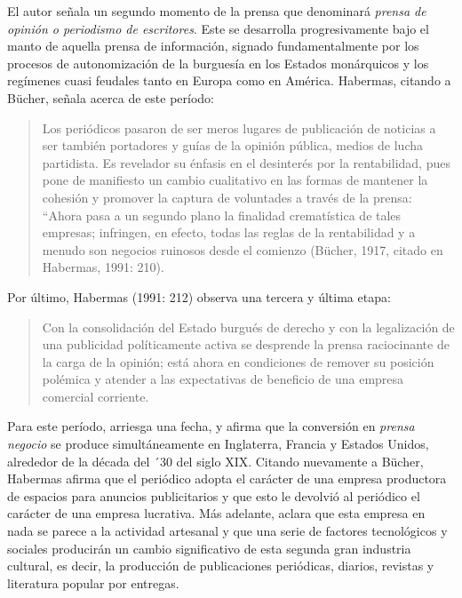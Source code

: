 El autor señala un segundo momento de la prensa que denominará \emph{prensa de opinión o periodismo de escritores}. Este se desarrolla progresivamente bajo el manto de aquella prensa de información, signado fundamentalmente por los procesos de autonomización de la burguesía en los Estados monárquicos y los regímenes cuasi feudales tanto en Europa como en América. Habermas, citando a Bücher, señala acerca de este período:

\begin{quote}
Los periódicos pasaron de ser meros lugares de publicación de noticias a ser también portadores y guías de la opinión pública, medios de lucha partidista. Es revelador su énfasis en el desinterés por la rentabilidad, pues pone de manifiesto un cambio cualitativo en las formas de mantener la cohesión y promover la captura de voluntades a través de la prensa: ``Ahora pasa a un segundo plano la finalidad crematística de tales empresas; infringen, en efecto, todas las reglas de la rentabilidad y a menudo son negocios ruinosos desde el comienzo (Bücher, 1917, citado en Habermas, 1991: 210).
\end{quote}

Por último, Habermas (1991: 212) observa una tercera y última etapa:

\begin{quote}
Con la consolidación del Estado burgués de derecho y con la legalización de una publicidad políticamente activa se desprende la prensa raciocinante de la carga de la opinión; está ahora en condiciones de remover su posición polémica y atender a las expectativas de beneficio de una empresa comercial corriente.
\end{quote}

Para este período, arriesga una fecha, y afirma que la conversión en \emph{prensa negocio} se produce simultáneamente en Inglaterra, Francia y Estados Unidos, alrededor de la década del ´30 del siglo XIX. Citando nuevamente a Bücher, Habermas afirma que el periódico adopta el carácter de una empresa productora de espacios para anuncios publicitarios y que esto le devolvió al periódico el carácter de una empresa lucrativa. Más adelante, aclara que esta empresa en nada se parece a la actividad artesanal y que una serie de factores tecnológicos y sociales producirán un cambio significativo de esta segunda gran industria cultural, es decir, la producción de publicaciones periódicas, diarios, revistas y literatura popular por entregas.

